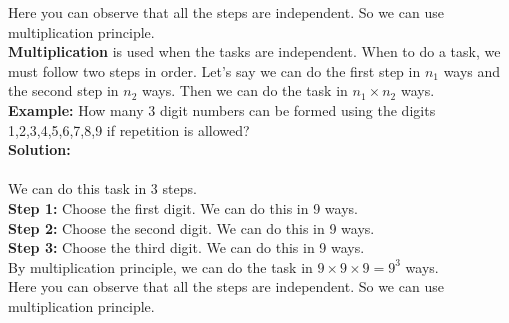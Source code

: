 \newline
Here you can observe that all the steps are independent. So we can use multiplication principle.\\
\textbf{Multiplication} is used when the tasks are independent.
When to do a task, we must follow two steps in order. Let's say we can do the first step in $n_1$ ways
and the second step in $n_2$ ways. Then we can do the task in $n_1\times n_2$ ways.\\
\newline
\textbf{Example:} How many 3 digit numbers can be formed using the digits 1,2,3,4,5,6,7,8,9
if repetition is allowed?\\
\newline
\textbf{Solution:} \\~~\\We can do this task in 3 steps.\\
\textbf{Step 1:} Choose the first digit. We can do this in 9 ways.\\
\textbf{Step 2:} Choose the second digit. We can do this in 9 ways.\\
\textbf{Step 3:} Choose the third digit. We can do this in 9 ways.\\
By multiplication principle, we can do the task in $9\times 9\times 9 = 9^3$ ways.\\ 
\newline
Here you can observe that all the steps are independent. So we can use multiplication principle.\\